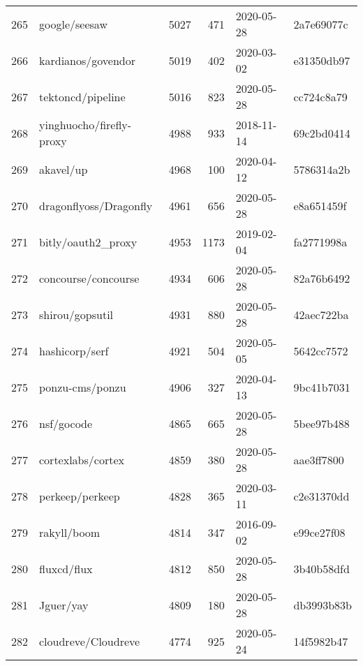 \begin{longtable}{llrrll}
    265 &                                      google/seesaw &   5027 &    471 & 2020-05-28 &  2a7e69077c \\
    266 &                                 kardianos/govendor &   5019 &    402 & 2020-03-02 &  e31350db97 \\
    267 &                                  tektoncd/pipeline &   5016 &    823 & 2020-05-28 &  cc724c8a79 \\
    268 &                           yinghuocho/firefly-proxy &   4988 &    933 & 2018-11-14 &  69c2bd0414 \\
    269 &                                          akavel/up &   4968 &    100 & 2020-04-12 &  5786314a2b \\
    270 &                             dragonflyoss/Dragonfly &   4961 &    656 & 2020-05-28 &  e8a651459f \\
    271 &                                 bitly/oauth2\_proxy &   4953 &   1173 & 2019-02-04 &  fa2771998a \\
    272 &                                concourse/concourse &   4934 &    606 & 2020-05-28 &  82a76b6492 \\
    273 &                                    shirou/gopsutil &   4931 &    880 & 2020-05-28 &  42aec722ba \\
    274 &                                     hashicorp/serf &   4921 &    504 & 2020-05-05 &  5642cc7572 \\
    275 &                                    ponzu-cms/ponzu &   4906 &    327 & 2020-04-13 &  9bc41b7031 \\
    276 &                                         nsf/gocode &   4865 &    665 & 2020-05-28 &  5bee97b488 \\
    277 &                                  cortexlabs/cortex &   4859 &    380 & 2020-05-28 &  aae3ff7800 \\
    278 &                                    perkeep/perkeep &   4828 &    365 & 2020-03-11 &  c2e31370dd \\
    279 &                                        rakyll/boom &   4814 &    347 & 2016-09-02 &  e99ce27f08 \\
    280 &                                        fluxcd/flux &   4812 &    850 & 2020-05-28 &  3b40b58dfd \\
    281 &                                          Jguer/yay &   4809 &    180 & 2020-05-28 &  db3993b83b \\
    282 &                                cloudreve/Cloudreve &   4774 &    925 & 2020-05-24 &  14f5982b47 \\

\end{longtable}
